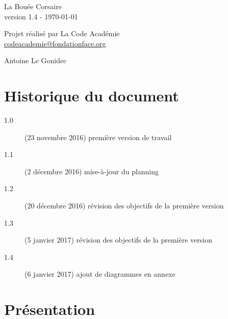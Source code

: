 \documentclass[french,12pt]{article}
\begin{document}
	\begin{titlepage}
		\begin{center}

			\vspace*{\fill}

			{\Huge
				La Bouée Corsaire
			}\\ [0.5cm]
			{\large
				version 1.4 - \today
			}\\

			\vspace*{\fill}

			{\Large
				Projet réalisé par La Code Académie
			}\\ [0.5cm]
			{\large
				\href{mailto:codeacademie@fondationface.org}{
					codeacademie@fondationface.org
				}
			}\\

			\vspace*{\fill}

			{\Large
				Antoine Le Gonidec
			}

			\vspace*{\fill}

		\end{center}
	\end{titlepage}

	\newpage
	\tableofcontents

	\newpage
	\section{Historique du document}
	\begin{description}
		\item [1.0] (23 novembre 2016) première version de travail
		\item [1.1] (2 décembre 2016) mise-à-jour du planning
		\item [1.2] (20 décembre 2016) révision des objectifs de la première version
		\item [1.3] (5 janvier 2017) révision des objectifs de la première version
		\item [1.4] (6 janvier 2017) ajout de diagrammes en annexe
	\end{description}

	\newpage
	\section{Présentation}
\end{document}
